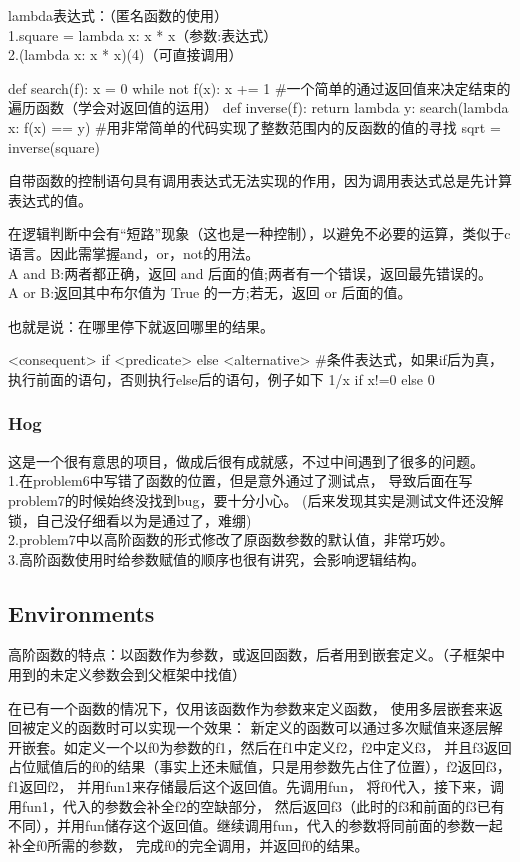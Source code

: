\documentclass{ctexart}
\begin{document}
lambda表达式：（匿名函数的使用）
\\1.square = lambda x: x * x（参数:表达式）
\\2.(lambda x: x * x)(4)（可直接调用）
\begin{python}
    def search(f):
        x = 0
        while not f(x):
            x += 1
#一个简单的通过返回值来决定结束的遍历函数（学会对返回值的运用）
    def inverse(f):
        return lambda y: search(lambda x: f(x) == y)
#用非常简单的代码实现了整数范围内的反函数的值的寻找
    sqrt = inverse(square)
\end{python}

自带函数的控制语句具有调用表达式无法实现的作用，因为调用表达式总是先计算表达式的值。

在逻辑判断中会有“短路”现象（这也是一种控制），以避免不必要的运算，类似于c语言。因此需掌握and，or，not的用法。
\\A and B:两者都正确，返回 and 后面的值;两者有一个错误，返回最先错误的。
\\A or B:返回其中布尔值为 True 的一方;若无，返回 or 后面的值。

也就是说：在哪里停下就返回哪里的结果。

\begin{python}
    <consequent> if <predicate> else <alternative>
    #条件表达式，如果if后为真，执行前面的语句，否则执行else后的语句，例子如下
    1/x if x!=0 else 0
\end{python}
\subsubsection{Hog}
这是一个很有意思的项目，做成后很有成就感，不过中间遇到了很多的问题。
\\1.在problem6中写错了函数的位置，但是意外通过了测试点，
导致后面在写problem7的时候始终没找到bug，要十分小心。
(后来发现其实是测试文件还没解锁，自己没仔细看以为是通过了，难绷)
\\2.problem7中以高阶函数的形式修改了原函数参数的默认值，非常巧妙。
\\3.高阶函数使用时给参数赋值的顺序也很有讲究，会影响逻辑结构。
\subsection{Environments}
高阶函数的特点：以函数作为参数，或返回函数，后者用到嵌套定义。（子框架中用到的未定义参数会到父框架中找值）

在已有一个函数的情况下，仅用该函数作为参数来定义函数，
使用多层嵌套来返回被定义的函数时可以实现一个效果：
新定义的函数可以通过多次赋值来逐层解开嵌套。如定义一个以f0为参数的f1，然后在f1中定义f2，f2中定义f3，
并且f3返回占位赋值后的f0的结果（事实上还未赋值，只是用参数先占住了位置），f2返回f3，f1返回f2，
并用fun1来存储最后这个返回值。先调用fun，
将f0代入，接下来，调用fun1，代入的参数会补全f2的空缺部分，
然后返回f3（此时的f3和前面的f3已有不同），并用fun储存这个返回值。继续调用fun，代入的参数将同前面的参数一起补全f0所需的参数，
完成f0的完全调用，并返回f0的结果。
\end{document}
